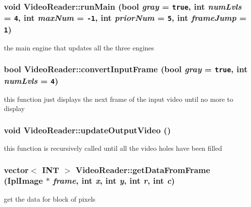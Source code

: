 \subsubsection{\setlength{\rightskip}{0pt plus 5cm}void VideoReader::runMain (bool {\em gray} = {\tt true}, int {\em numLvls} = {\tt 4}, int {\em maxNum} = {\tt -1}, int {\em priorNum} = {\tt 5}, int {\em frameJump} = {\tt 1})}\label{classVideoReader_7d3f6428ad3227214553385f1b4eb42a}


the main engine that updates all the three engines 

\subsubsection{\setlength{\rightskip}{0pt plus 5cm}bool VideoReader::convertInputFrame (bool {\em gray} = {\tt true}, int {\em numLvls} = {\tt 4})}\label{classVideoReader_58b0f6af53127781dcba478ea6f3608c}


this function just displays the next frame of the input video until no more to display 

\subsubsection{\setlength{\rightskip}{0pt plus 5cm}void VideoReader::updateOutputVideo ()}\label{classVideoReader_cad516b891d8ad1c792734c76906de3e}


this function is recursively called until all the video holes have been filled 

\subsubsection{\setlength{\rightskip}{0pt plus 5cm}vector$<$ {\bf INT} $>$ VideoReader::getDataFromFrame (IplImage $\ast$ {\em frame}, int {\em x}, int {\em y}, int {\em r}, int {\em c})}\label{classVideoReader_e458f2b3d47bfc1750092716ce082fb8}


get the data for block of pixels 

